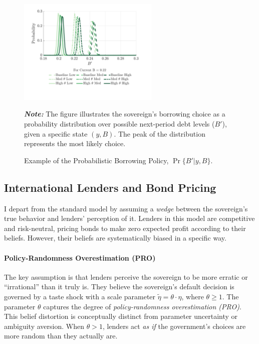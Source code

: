 \documentclass[12pt]{article}
\theoremstyle{plain}
\begin{document}
\begin{figure}[h!]
	\centering
	\includegraphics[width=0.6\textwidth]{../../pro-default-model/results/comparison_figure_8.pdf}
	\caption{Example of the Probabilistic Borrowing Policy, $\Pr\{B'|y,B\}$.}
	\label{fig:borrowing_dist_example}
	\parbox{\textwidth}{\small\textit{\textbf{Note:} }The figure illustrates the sovereign's borrowing choice as a probability distribution over possible next-period debt levels ($B'$), given a specific state $(y, B)$. The peak of the distribution represents the most likely choice.}
\end{figure}

\subsection{International Lenders and Bond Pricing}

I depart from the standard model by assuming a \textit{wedge} between the
sovereign's true behavior and lenders' perception of it. Lenders in this model
are competitive and risk-neutral, pricing bonds to make zero expected profit
according to their beliefs. However, their beliefs are systematically biased in
a specific way.

\paragraph{Policy-Randomness Overestimation (PRO)}The key assumption is that lenders perceive the sovereign to be more erratic or
``irrational'' than it truly is. They believe the sovereign's default decision
is governed by a taste shock with a scale parameter $\tilde{\eta} = \theta
	\cdot \eta$, where $\theta \ge 1$. The parameter $\theta$ captures the degree
of \textit{policy-randomness overestimation (PRO)}. This belief distortion is
conceptually distinct from parameter uncertainty or ambiguity aversion. When
$\theta > 1$, lenders act \textit{as if} the government's choices are more
random than they actually are.
\end{document}
